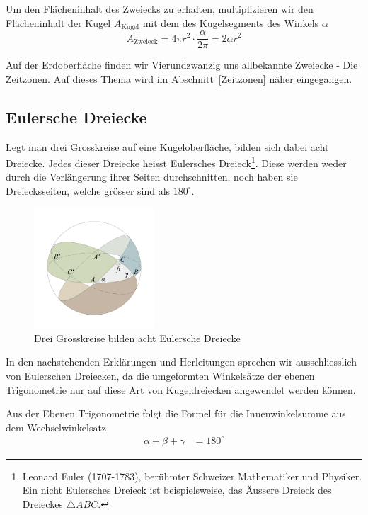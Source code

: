 \begin{refsection}
Um den Flächeninhalt des Zweiecks zu erhalten, multiplizieren wir den Flächeninhalt der Kugel $A_\text{Kugel}$ mit dem des Kugelsegments des Winkels $\alpha$ 
\begin{equation}
A_\text{Zweieck} = 4 \pi r^{2} \cdot \frac{ \alpha }{ 2 \pi } = 2 \alpha r^{2}
\label {V5}
\end{equation}

Auf der Erdoberfläche finden wir Vierundzwanzig uns allbekannte Zweiecke - Die Zeitzonen. Auf dieses Thema wird im Abschnitt~\ref{Zeitzonen}  näher eingegangen.


\subsection{Eulersche Dreiecke} \label{Euler} 
Legt man drei Grosskreise auf eine Kugeloberfläche, bilden sich dabei acht Dreiecke. 
Jedes dieser Dreiecke heisst Eulersches Dreieck\footnote{%
Leonard Euler (1707-1783), berühmter Schweizer Mathematiker und Physiker. 
Ein nicht Eulersches Dreieck ist beispielsweise, das Äussere Dreieck des Dreieckes 
$\triangle{ABC}$.}.
Diese werden weder durch die Verlängerung ihrer Seiten durchschnitten, 
noch haben sie Dreiecksseiten, welche grösser sind als $180^{\circ}$.

\begin{figure}[htbp]
\centering
\includegraphics[width=0.4\textwidth]{kugel/EulerschesDreieck.jpg}
\caption{Drei Grosskreise bilden acht Eulersche Dreiecke}
\end{figure}


In den nachstehenden Erklärungen und Herleitungen sprechen wir ausschliesslich von Eulerschen Dreiecken, da die umgeformten Winkelsätze der ebenen Trigonometrie nur auf diese Art von Kugeldreiecken angewendet werden können.

Aus der Ebenen Trigonometrie folgt die Formel für die Innenwinkelsumme aus dem Wechselwinkelsatz
\begin{align*}
\alpha + \beta + \gamma &= 180^{\circ}
\end{align*}


\end{refsection}
